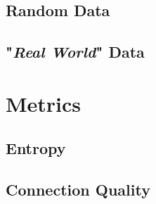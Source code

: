 \documentclass[ClusteringConnectionsMAIN.tex]{subfiles}
\begin{document}
\section{Random Data}


\section{"\emph{Real World}" Data}



%
%
\chapter{Metrics}


\section{Entropy}


\section{Connection Quality}

\end{document}
